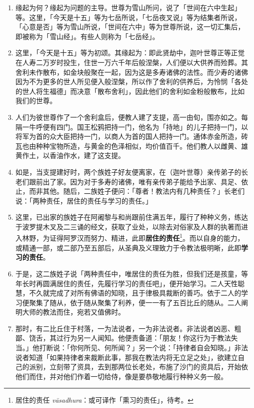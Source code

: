 \begin{enumerate}\item 缘起为何？缘起为问题的主导。世尊为雪山所问，说了「世间在六中生起」等。这里，「今天是十五」等为七岳所说，「七岳夜叉说」等为结集者所说，「心意是否」等为雪山所说，「世间在六中」等为世尊所说，这一切汇集后，即被称为「雪山经」。有些人则称为「七岳经」。
\item 这里，「今天是十五」等为初颂。其缘起为：即此贤劫中，迦叶世尊正等正觉在人寿二万岁时投生，住世一万六千年后般涅槃，人们便以大供养而殓葬。其舍利未作散布，如金块般聚在一起，因为这是多寿诸佛的法性。而少寿的诸佛因为不为更多的世人所见便入般涅槃，所以作了舍利的供养后，为怜悯「各处的世人将生福德」而决意「散布舍利」，因此他们的舍利如金粉般散布，比如我们的世尊。
\item 人们为彼世尊作了一个舍利盒后，便教人建了支提，高一由旬，围亦如之。每隔一牛呼便有四门。国王松鸦把持一门，他名为「持地」的儿子把持一门，以将军为首的众大臣把持一门，以商人为首的国人把持一门。通体赤金所造，砖瓦也由种种宝物所造，与黄金的色泽相似，均价值百千。他们教人以雌黄、雄黄作土，以香油作水，建了这支提。
\item 如是，当支提建好时，两个族姓子好友便离家，在（迦叶世尊）亲传弟子的长老们跟前出了家。因为对于多寿的诸佛，唯有亲传弟子能给予出家、具足、依止，而非其他。随后，二族姓子便问：「尊者！教法内有几种责任？」长老们说：「两种责任，居住的责任与学习的责任。」
\item 这里，已出家的族姓子在阿阇黎与和尚跟前住满五年，履行了种种义务，练达于波罗提木叉及二三诵的经文，获取了业处，以除去对俗家及人群的执著而进入林野，为证得阿罗汉而努力、精进，此即\textbf{居住的责任}\footnote{居住的责任 \textit{vāsadhura}：或可译作「熏习的责任」，待考。}。而以自身的能力，或精通一部，或二部乃至五部后，从圣典及义理致力于令教法极明晰，此即\textbf{学习的责任}。
\item 于是，这二族姓子说「两种责任中，唯居住的责任为胜，但我们还是孩童，等年长时再圆满居住的责任，先履行学习的责任吧」，便开始学习。二人天性聪慧，不久就完成了对所有佛语的知晓，且于律极具裁断的善巧。依于二人的学习便聚集了随从，依于随从聚集了利养，便一一有了五百比丘的随从。二人阐明大师的教法而住，宛若又值佛时。
\item 那时，有二比丘住于村落，一为法说者，一为非法说者。非法说者凶恶、粗鄙、饶舌，其过行为另一人闻知。他便责备道：「朋友！你这行为于教法失当。」他打断说：「你何所见、何所闻？」另一个说：「持律者自会知晓。」非法说者知道「如果持律者来裁断此事，那我在教法内将无立足之处」，欲建立自己的派别，立刻带了资具，去到那两位长老处，布施了沙门的资具后，开始依他们而住，并对他们作着一切给侍，像是要恭敬地履行种种义务一般。

\end{enumerate}
